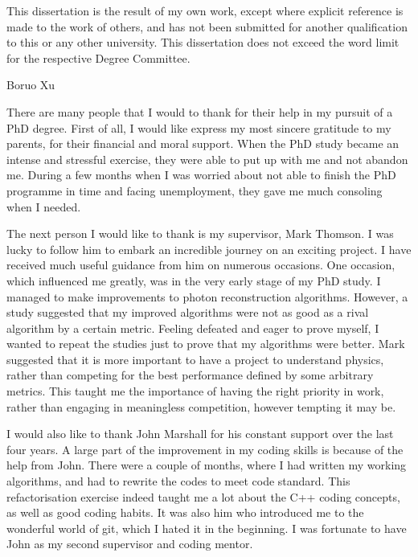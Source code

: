\begin{declaration}
  This dissertation is the result of my own work, except where explicit
  reference is made to the work of others, and has not been submitted
  for another qualification to this or any other university. This
  dissertation does not exceed the word limit for the respective Degree
  Committee.
  \vspace*{1cm}
  \begin{flushright}
    Boruo Xu
  \end{flushright}
\end{declaration}


\begin{acknowledgements}
There are many people that I would to thank  for their help in my pursuit of a PhD degree. First of all, I would like express my most sincere gratitude to my parents, for their financial and moral support. When the PhD study became an intense and stressful exercise, they were able to put up with me and not abandon me. During a few months when I was worried about not able to finish the PhD programme in time and facing unemployment, they gave me much consoling  when I needed.


The next person I would like to thank is my supervisor, Mark Thomson. I was lucky to follow him to embark an incredible journey on an exciting project. I have received much useful guidance from him on numerous occasions. One occasion, which influenced me greatly, was in the very early stage of my PhD study. I managed to make improvements to photon reconstruction algorithms. However, a study suggested that my improved algorithms were not as good as a rival algorithm by a certain metric. Feeling defeated and eager to prove myself, I wanted to repeat the studies just to prove that my algorithms were better. Mark suggested that it is more important to have a project to understand physics, rather than competing for the best performance defined by some arbitrary metrics. This taught me the importance of having the right priority in work, rather than engaging in meaningless competition, however tempting it may be.

I would also like to thank John Marshall for his constant support over the last four years. A large part of the improvement in my coding skills is because of the help from John. There were a couple of months, where I had written my working algorithms, and had to rewrite the codes to meet \pandora code standard. This refactorisation exercise indeed taught me a lot about the C++ coding concepts, as well as good coding habits. It was also him who introduced me to the wonderful world of git, which I hated it in the beginning. I was fortunate to have John as my second supervisor and coding mentor.


\end{acknowledgements}
